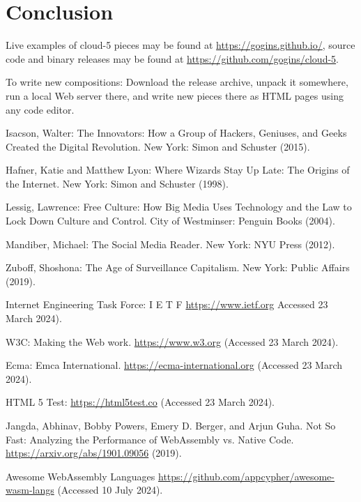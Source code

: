 \documentclass[runningheads,a4paper]{llncs}
\begin{document}
\section{Conclusion}

\noindent Live examples of cloud-5 pieces may be found at \url{https://gogins.github.io/}, source code and binary releases may be found at \url{https://github.com/gogins/cloud-5}. 

To write new compositions: Download the  release archive, unpack it somewhere, run a local Web server there, and write new pieces there as HTML pages using any code editor.

\begin{thebibliography}{4}

 Isacson, Walter: The Innovators: How a Group of Hackers, Geniuses, and Geeks Created the Digital Revolution. New York: Simon and Schuster (2015).


 Hafner, Katie and Matthew Lyon: Where Wizards Stay Up Late: The Origins of the Internet. New York: Simon and Schuster (1998).

 Lessig, Lawrence: Free Culture: How Big Media Uses Technology and the Law to Lock Down Culture and Control. City of Westminser: Penguin Books (2004).


 Mandiber, Michael: The Social Media Reader. New York: NYU Press (2012).

 Zuboff, Shoshona: The Age of Surveillance Capitalism. New York: Public Affairs (2019).

 Internet Engineering Task Force: I E T F \url{https://www.ietf.org} Accessed 23 March 2024).

 W3C: Making the Web work. \url{https://www.w3.org} (Accessed 23 March 2024).

 Ecma: Emca International. \url{https://ecma-international.org} (Accessed 23 March 2024).

 HTML 5 Test: \url{https://html5test.co} (Accessed 23 March 2024).

 Jangda, Abhinav, Bobby Powers, Emery D. Berger, and Arjun Guha. Not So Fast: Analyzing the Performance of WebAssembly vs. Native Code. \url{https://arxiv.org/abs/1901.09056} (2019).

 Awesome WebAssembly Languages \url{https://github.com/appcypher/awesome-wasm-langs} (Accessed 10 July 2024).


\end{thebibliography}
\end{document}
